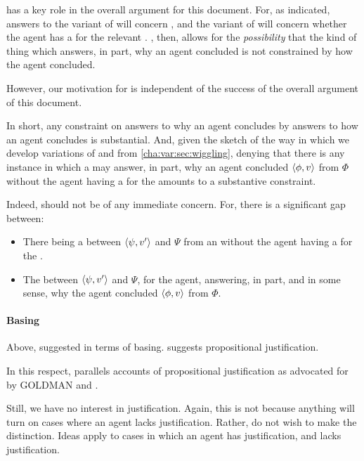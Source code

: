 \begin{note}
  \supportII{} has a key role in the overall argument for this document.
  For, as indicated, answers to the variant of \qWhy{} will concern \ros{}, and the variant of \qHow{} will concern whether the agent has a \wit{} for the relevant \ros{}.
  \supportII{}, then, allows for the \emph{possibility} that the kind of thing which answers, in part, why an agent concluded is not constrained by how the agent concluded.

  However, our motivation for \supportII{} is independent of the success of the overall argument of this document.

  In short, any constraint on answers to why an agent concludes by answers to how an agent concludes is substantial.
  And, given the sketch of the way in which we develop variations of \qWhy{} and \qHow{} from \autoref{cha:var:sec:wiggling}, denying that there is any instance in which a \ros{} may answer, in part, why an agent concluded \(\langle \phi, v \rangle\) from \(\Phi\) without the agent having a \wit{} for the \ros{} amounts to a substantive constraint.

  Indeed, \supportII{} should not be of any immediate concern.
  For, there is a significant gap between:

  \begin{itemize}[noitemsep]
  \item
    There being a \ros{} between \(\langle \psi, v' \rangle\) and \(\Psi\) from an \agpe{} without the agent having a \wit{} for the \ros{}.
  \item
    The \ros{} between \(\langle \psi, v' \rangle\) and \(\Psi\), for the agent, answering, in part, and in some sense, why the agent concluded \(\langle \phi, v \rangle\) from \(\Phi\).
  \end{itemize}
\end{note}

\paragraph{Basing}

\begin{note}
  Above, suggested \supportI{} in terms of basing.
  \supportII{} suggests propositional justification.

  In this respect, \supportII{} parallels accounts of propositional justification as advocated for by GOLDMAN and \citeauthor{Turri:2010aa}.

  Still, we have no interest in justification.
  Again, this is not because anything will turn on cases where an agent lacks justification.
  Rather, do not wish to make the distinction.
  Ideas apply to cases in which an agent has justification, and lacks justification.
\end{note}


